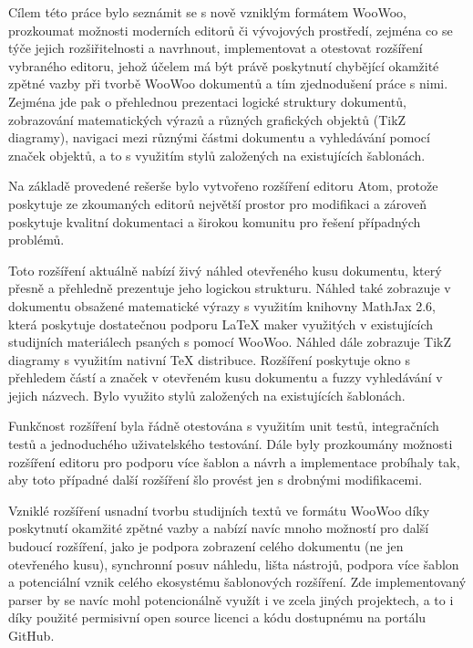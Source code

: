 Cílem této práce bylo seznámit se s nově vzniklým formátem WooWoo, prozkoumat možnosti moderních editorů či vývojových
prostředí, zejména co se týče jejich rozšiřitelnosti a navrhnout, implementovat a otestovat rozšíření vybraného editoru,
jehož účelem má být právě poskytnutí chybějící okamžité zpětné vazby při tvorbě WooWoo dokumentů a tím zjednodušení
práce s nimi. Zejména jde pak o přehlednou prezentaci logické struktury dokumentů, zobrazování matematických výrazů a
různých grafických objektů (TikZ diagramy), navigaci mezi různými částmi dokumentu a vyhledávání pomocí značek objektů,
a to s využitím stylů založených na existujících šablonách.

Na základě provedené rešerše bylo vytvořeno rozšíření editoru Atom, protože poskytuje ze zkoumaných editorů největší
prostor pro modifikaci a zároveň poskytuje kvalitní dokumentaci a širokou komunitu pro řešení případných problémů.

Toto rozšíření aktuálně nabízí živý náhled otevřeného kusu dokumentu, který přesně a přehledně prezentuje jeho logickou
strukturu. Náhled také zobrazuje v dokumentu obsažené matematické výrazy s využitím knihovny MathJax 2.6, která
poskytuje dostatečnou podporu LaTeX maker využitých v existujících studijních materiálech psaných s pomocí WooWoo.
Náhled dále zobrazuje TikZ diagramy s využitím nativní TeX distribuce. Rozšíření poskytuje okno s přehledem částí a
značek v otevřeném kusu dokumentu a fuzzy vyhledávání v jejich názvech. Bylo využito stylů založených na existujících
šablonách.

Funkčnost rozšíření byla řádně otestována s využitím unit testů, integračních testů a jednoduchého uživatelského
testování. Dále byly prozkoumány možnosti rozšíření editoru pro podporu více šablon a návrh a implementace probíhaly
tak, aby toto případné další rozšíření šlo provést jen s drobnými modifikacemi.

Vzniklé rozšíření usnadní tvorbu studijních textů ve formátu WooWoo díky poskytnutí okamžité zpětné vazby a nabízí navíc
mnoho možností pro další budoucí rozšíření, jako je podpora zobrazení celého dokumentu (ne jen otevřeného kusu),
synchronní posuv náhledu, lišta nástrojů, podpora více šablon a potenciální vznik celého ekosystému šablonových
rozšíření. Zde implementovaný parser by se navíc mohl potencionálně využít i ve zcela jiných projektech, a to i díky
použité permisivní open source licenci a kódu dostupnému na portálu GitHub.
